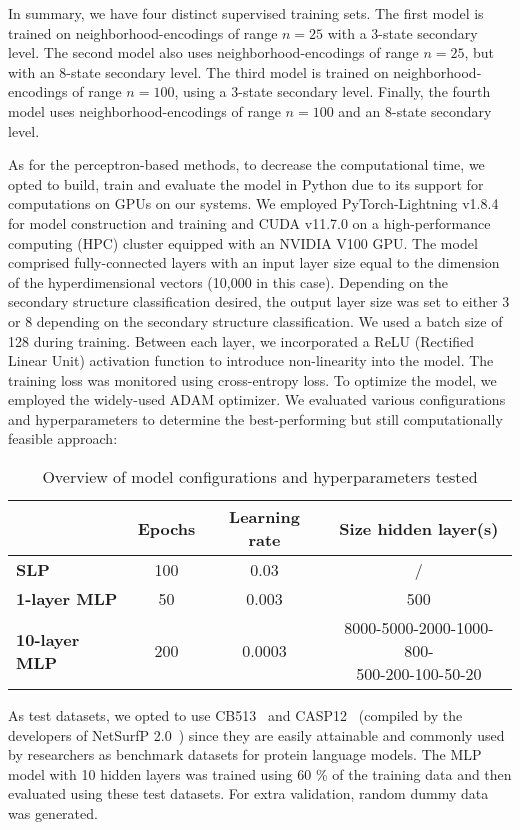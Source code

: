 In summary, we have four distinct supervised training sets. The first model is trained on neighborhood-encodings of range $n=25$ with a 3-state secondary level. The second model also uses neighborhood-encodings of range $n=25$, but with an 8-state secondary level. The third model is trained on neighborhood-encodings of range $n=100$, using a 3-state secondary level. Finally, the fourth model uses neighborhood-encodings of range $n=100$ and an 8-state secondary level.

As for the perceptron-based methods, to decrease the computational time, we opted to build, train and evaluate the model in Python due to its support for computations on GPUs on our systems. We employed PyTorch-Lightning v1.8.4 for model construction and training and CUDA v11.7.0 on a high-performance computing (HPC) cluster equipped with an NVIDIA V100 GPU. The model comprised fully-connected layers with an input layer size equal to the dimension of the hyperdimensional vectors (10,000 in this case). Depending on the secondary structure classification desired, the output layer size was set to either 3 or 8 depending on the secondary structure classification. We used a batch size of 128 during training. Between each layer, we incorporated a ReLU (Rectified Linear Unit) activation function to introduce non-linearity into the model. The training loss was monitored using cross-entropy loss. To optimize the model, we employed the widely-used ADAM optimizer. We evaluated various configurations and hyperparameters to determine the best-performing but still computationally feasible approach:

\begin{table}[h]
    \caption{Overview of model configurations and hyperparameters tested}
    \label{tab:casp8}
    \centering
    \begin{tabular}{l|ccc}
        \toprule
         & Epochs & Learning rate & Size hidden layer(s)\\
        \midrule
        \textbf{SLP} & 100 & 0.03 & /\\
        \hline
        \textbf{1-layer MLP} & 50 & 0.003 & 500\\
        \hline
        \textbf{10-layer MLP} & 200 & 0.0003 & \makecell{8000-5000-2000-1000-800-\\500-200-100-50-20}\\
        \bottomrule
    \end{tabular}
  \end{table}

As test datasets, we opted to use CB513~\cite{cb513} and CASP12~\cite{casp12} (compiled by the developers of NetSurfP 2.0~\cite{netsurf}) since they are easily attainable and commonly used by researchers as benchmark datasets for protein language models. The MLP model with 10 hidden layers was trained using 60 \% of the training data and then evaluated using these test datasets. For extra validation, random dummy data was generated.

